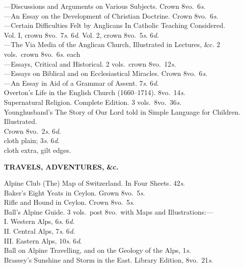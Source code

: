 \documentclass[letterpaper,12pt,oneside,openany]{memoir}
\newcommand{\D}{\hspace*{5mm}}
\newcommand{\E}{\hspace*{2mm}---\hspace*{2mm}}
\begin{document}
\begin{footnotesize}
\E Discussions and Arguments on Various Subjects. Crown 8vo.\ 6\textit{s}.\\
\E An Essay on the Development of Christian Doctrine. Crown 8vo.\ 6\textit{s}.\\
\E Certain Difficulties Felt by Anglicans In Catholic Teaching Considered.\\
\D\D Vol. I, crown 8vo.\ 7\textit{s}. 6\textit{d}. Vol. 2, crown 8vo.\ 5\textit{s}. 6\textit{d}.\\
\E The Via Media of the Anglican Church, Illustrated in Lectures, \&c. 2 vols.\ crown 8vo.\ 6\textit{s}. each\\
\E Essays, Critical and Historical. 2 vols.\ crown 8vo.\ 12\textit{s}.\\
\E Essays on Biblical and on Ecclesiastical Miracles. Crown 8vo.\ 6\textit{s}.\\
\E An Essay in Aid of a Grammar of Assent. 7\textit{s}. 6\textit{d}.\\
Overton's Life in the English Church (1660--1714). 8vo.\ 14\textit{s}.\\
Supernatural Religion. Complete Edition. 3 vols.\ 8vo.\ 36\textit{s}.\\
Younghusband's The Story of Our Lord told in Simple Language for Children. Illustrated.\\
\D Crown 8vo.\ 2\textit{s}. 6\textit{d}. \\
\D cloth plain; 3\textit{s}. 6\textit{d}. \\
\D cloth extra, gilt edges.
\begin{center}
\textbf{TRAVELS, ADVENTURES, \&c.}
\end{center}
Alpine Club (The) Map of Switzerland. In Four Sheets. 42\textit{s}.\\
Baker's Eight Yeats in Ceylon. Grown 8vo.\ 5\textit{s}.\\
\D Rifle and Hound in Ceylon. Crown 8vo.\ 5\textit{s}.\\
Ball's Alpine Guide. 3 vols.\ post 8vo.\ with Maps and Illustrations:---\\
\D I\@. Western Alps, 6\textit{s}. 6\textit{d}. \\
\D II\@. Central Alps, 7\textit{s}. 6\textit{d}. \\
\D III\@. Eastern Alps, 10\textit{s}. 6\textit{d}.\\
Ball on Alpine Travelling, and on the Geology of the Alps, 1\textit{s}.\\
Brassey's Sunshine and Storm in the East. Library Edition, 8vo.\ 21\textit{s}. \\

\end{footnotesize}
\end{document}
